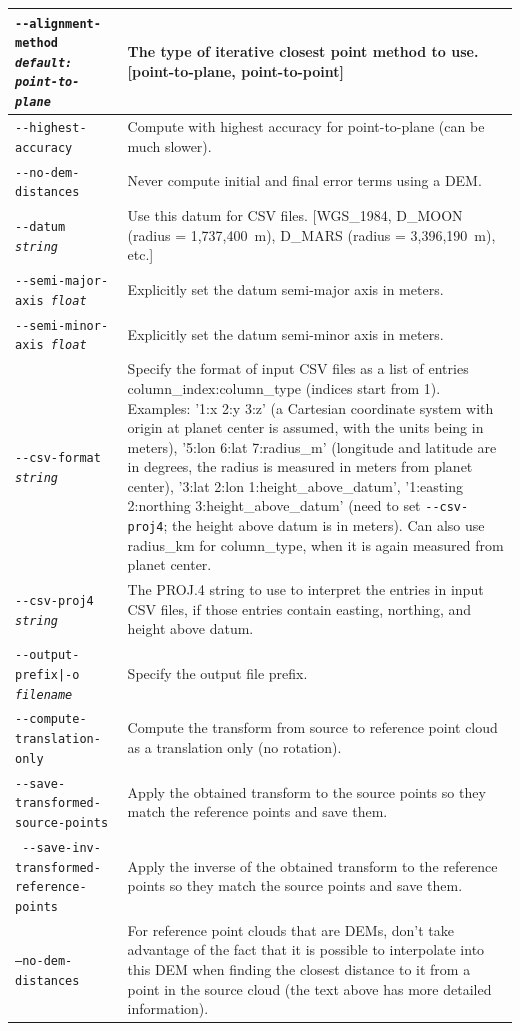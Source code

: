 \begin{longtable}{|p{8cm}|p{9cm}|}
\texttt{-\/-alignment-method \textit{default: point-to-plane}} & The type of iterative closest point
method to use. [point-to-plane, point-to-point]\\ \hline
\texttt{-\/-highest-accuracy} & Compute with highest accuracy for point-to-plane (can be much slower). \\ \hline
\texttt{-\/-no-dem-distances} & Never compute initial and final error terms using a DEM. \\ \hline
\texttt{-\/-datum \textit{string}} & Use this datum for CSV files. [WGS\_1984, D\_MOON (radius = 1,737,400~m), D\_MARS (radius = 3,396,190~m), etc.] \\ \hline

\texttt{-\/-semi-major-axis \textit{float}} & Explicitly set the datum semi-major axis in meters.\\ \hline
\texttt{-\/-semi-minor-axis \textit{float}} & Explicitly set the datum semi-minor axis in meters.\\ \hline

\texttt{-\/-csv-format \textit{string}} & Specify the format of input
CSV files as a list of entries column\_index:column\_type (indices start
from 1). Examples: '1:x 2:y 3:z' (a Cartesian coordinate system with
origin at planet center is assumed, with the units being in meters),
'5:lon 6:lat 7:radius\_m' (longitude and latitude are in degrees, the
radius is measured in meters from planet center), '3:lat 2:lon
1:height\_above\_datum', '1:easting 2:northing 3:height\_above\_datum'
(need to set \texttt{-\/-csv-proj4}; the height above datum is in
meters). Can also use radius\_km for column\_type, when it is again
measured from planet center. \\ \hline

\texttt{-\/-csv-proj4 \textit{string}} & The PROJ.4 string to use to
interpret the entries in input CSV files, if those entries contain
easting, northing, and height above datum. \\ \hline

\texttt{-\/-output-prefix|-o \textit{filename}} & Specify the output file prefix. \\ \hline
\texttt{-\/-compute-translation-only} & Compute the transform from source to reference point cloud as a translation only (no rotation). \\ \hline
\texttt{-\/-save-transformed-source-points} & Apply the obtained transform to the source points so they match the reference points and save them. \\ \hline
\texttt{ -\/-save-inv-transformed-reference-points} & Apply the inverse of the obtained transform to the reference points so they match the source points and save them.
\\ \hline
\texttt{--no-dem-distances} & For reference point clouds that are DEMs, don't take advantage of the fact that it is possible to interpolate into this DEM when finding the closest distance to it from a point in the source cloud (the text above has more detailed information). \\ \hline


\end{longtable}
